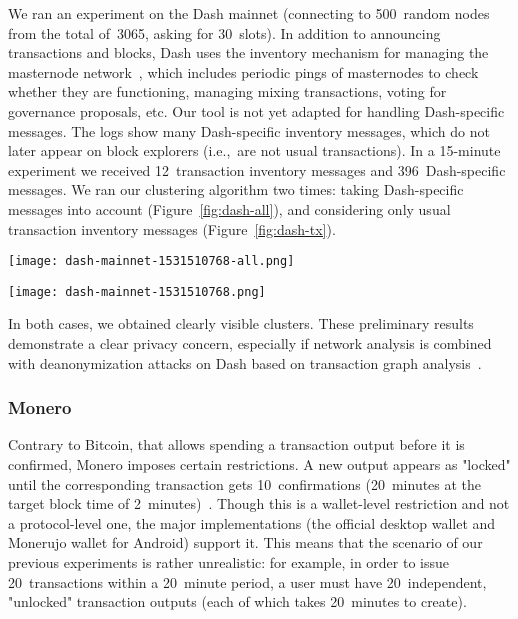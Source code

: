 We ran an experiment on the Dash mainnet (connecting to 500~random nodes from the total of~3065, asking for 30~slots).
In addition to announcing transactions and blocks, Dash uses the inventory mechanism for managing the masternode network~\cite{Schinzel2015}, which includes periodic pings of masternodes to check whether they are functioning, managing mixing transactions, voting for governance proposals, etc.
Our tool is not yet adapted for handling Dash-specific messages.
The logs show many Dash-specific inventory messages, which do not later appear on block explorers (i.e.,~are not usual transactions).
In a 15-minute experiment we received  12~transaction inventory messages and 396~Dash-specific messages.
We ran our clustering algorithm two times: taking Dash-specific messages into account (Figure~\ref{fig:dash-all}), and considering only usual transaction inventory messages (Figure~\ref{fig:dash-tx}).


\begin{figure*}
	\centering
	\begin{minipage}{0.5\textwidth}
		\centering
		\texttt{[image: dash-mainnet-1531510768-all.png]}
		\caption{Dash (Dash-specific messages and usual transactions)}
	\end{minipage}\hfill
	\begin{minipage}{0.5\textwidth}
		\centering
		\texttt{[image: dash-mainnet-1531510768.png]}
		\caption{Dash (usual transactions)}
	\end{minipage}\hfill
	\label{fig:dash-all}
\end{figure*}


In both cases, we obtained clearly visible clusters.
These preliminary results demonstrate a clear privacy concern, especially if network analysis is combined with deanonymization attacks on Dash based on transaction graph analysis~\cite{Kalodner2017}. 


\subsubsection{Monero}

Contrary to Bitcoin, that allows spending a transaction output before it is confirmed, Monero imposes certain restrictions.
A new output appears as "locked" until the corresponding transaction gets 10~confirmations (20~minutes at the target block time of 2~minutes)~\cite{dpzz2017}.
Though this is a wallet-level restriction and not a protocol-level one, the major implementations (the official desktop wallet and Monerujo wallet for Android) support it.
This means that the scenario of our previous experiments is rather unrealistic: for example, in order to issue 20~transactions within a 20~minute period, a user must have 20~independent, "unlocked" transaction outputs (each of which takes 20~minutes to create).

